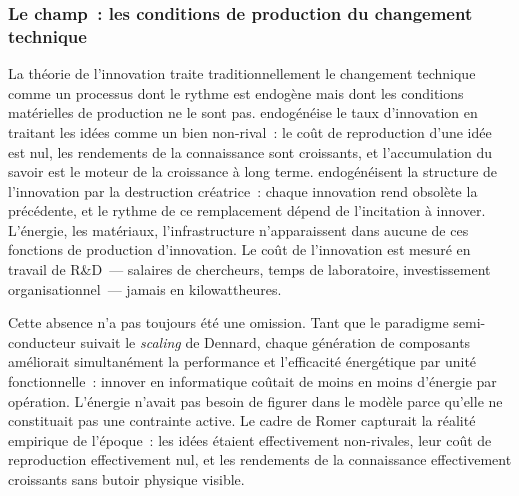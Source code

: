 \subsubsection{Le champ~: les conditions de production du changement technique}



\markEVO \markNEO
La théorie de l'innovation traite traditionnellement le changement technique comme un processus dont le rythme est endogène mais dont les conditions matérielles de production ne le sont pas. \textcite{romer_endogenous_1990} endogénéise le taux d'innovation en traitant les idées comme un bien non-rival~: le coût de reproduction d'une idée est nul, les rendements de la connaissance sont croissants, et l'accumulation du savoir est le moteur de la croissance à long terme. \textcite{aghion_model_1992} endogénéisent la structure de l'innovation par la destruction créatrice~: chaque innovation rend obsolète la précédente, et le rythme de ce remplacement dépend de l'incitation à innover.  L'énergie, les matériaux, l'infrastructure n'apparaissent dans aucune de ces fonctions de production d'innovation. Le coût de l'innovation est mesuré en travail de R\&D~--- salaires de chercheurs, temps de laboratoire, investissement organisationnel~--- jamais en kilowattheures.

Cette absence n'a pas toujours été une omission. Tant que le paradigme semi-conducteur suivait le \emph{scaling} de Dennard, chaque génération de composants améliorait simultanément la performance et l'efficacité énergétique par unité fonctionnelle~: innover en informatique coûtait de moins en moins d'énergie par opération. L'énergie n'avait pas besoin de figurer dans le modèle parce qu'elle ne constituait pas une contrainte active. Le cadre de Romer capturait la réalité empirique de l'époque~: les idées étaient effectivement non-rivales, leur coût de reproduction effectivement nul, et les rendements de la connaissance effectivement croissants sans butoir physique visible.

